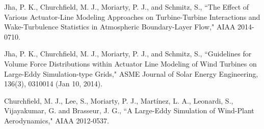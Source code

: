 \documentclass[]{aiaa-tc}%
\begin{document}
\begin{thebibliography}{9}%

Jha, P. K., Churchfield, M. J., Moriarty, P. J., and Schmitz, S., ``The Effect of Various Actuator-Line   Modeling Approaches on Turbine-Turbine Interactions and Wake-Turbulence Statistics in Atmospheric Boundary-Layer Flow," AIAA 2014-0710.

Jha, P. K., Churchfield, M. J., Moriarty, P. J., and Schmitz, S., ``Guidelines for Volume Force  Distributions within Actuator Line Modeling of Wind Turbines on Large-Eddy Simulation-type Grids," ASME Journal of Solar Energy Engineering, 136(3), 0310014 (Jan 10, 2014).

Churchfield, M. J., Lee, S., Moriarty, P. J., Martínez, L. A., Leonardi, S., Vijayakumar, G. and  Brasseur, J. G., ``A Large-Eddy Simulation of Wind-Plant Aerodynamics," AIAA 2012-0537.


\end{thebibliography}
\end{document}
